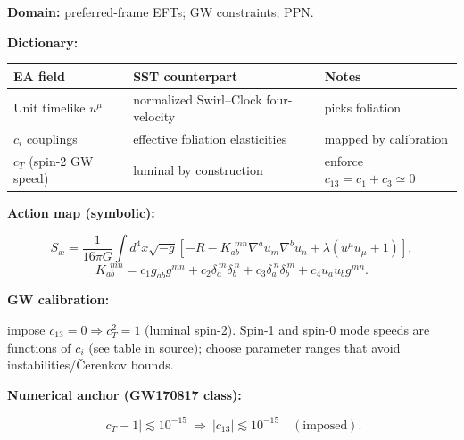 \documentclass[11pt]{article}
\begin{document}
        \begin{tcolorbox}[title=Rosetta Card: Einstein–Æther/Khronon $\to$ SST (Swirl–Clock)]
            \small
            \textbf{Domain:} preferred-frame EFTs; GW constraints; PPN.

            \begin{center}
                \textbf{Dictionary:}\\
            \end{center}

            \begin{tabular}{@{}lll@{}}
                \toprule
                EA field & SST counterpart & Notes \\
                \midrule
                Unit timelike $u^\mu$ & normalized Swirl–Clock four-velocity & picks foliation \\
                $c_i$ couplings & effective foliation elasticities & mapped by calibration \\
                $c_T$ (spin-2 GW speed) & luminal by construction & enforce $c_{13}\!=\!c_1{+}c_3\simeq 0$ \\
                \bottomrule
            \end{tabular}

            \begin{center}
                \textbf{Action map (symbolic):}\\
            \end{center}
            \[
                S_{\text{\ae}}=\frac{1}{16\pi G}\!\int\! d^4x\sqrt{-g}\!\left[-R
                -K^{\ \ mn}_{ab}\nabla^a u_m \nabla^b u_n
                +\lambda(u^\mu u_\mu+1)\right],
            \]
            \[
                K^{\ \ mn}_{ab}=c_1 g_{ab}g^{mn}+c_2\delta_a^{\ m}\delta_b^{\ n}+c_3\delta_a^{\ n}\delta_b^{\ m}
                +c_4 u_a u_b g^{mn}.
            \]
            \begin{center}\textbf{GW calibration:}   \end{center} impose $c_{13}=0\Rightarrow c_T^2=1$ (luminal spin-2). Spin-1 and spin-0 mode speeds are functions of $c_i$ (see table in source); choose parameter ranges that avoid instabilities/Čerenkov bounds.

            \begin{center}\textbf{Numerical anchor (GW170817 class):}   \end{center}
            \[
                |c_T-1|\lesssim 10^{-15}\ \Rightarrow\ |c_{13}|\lesssim 10^{-15}\quad(\text{imposed}).
            \]



\end{tcolorbox}
\end{document}
